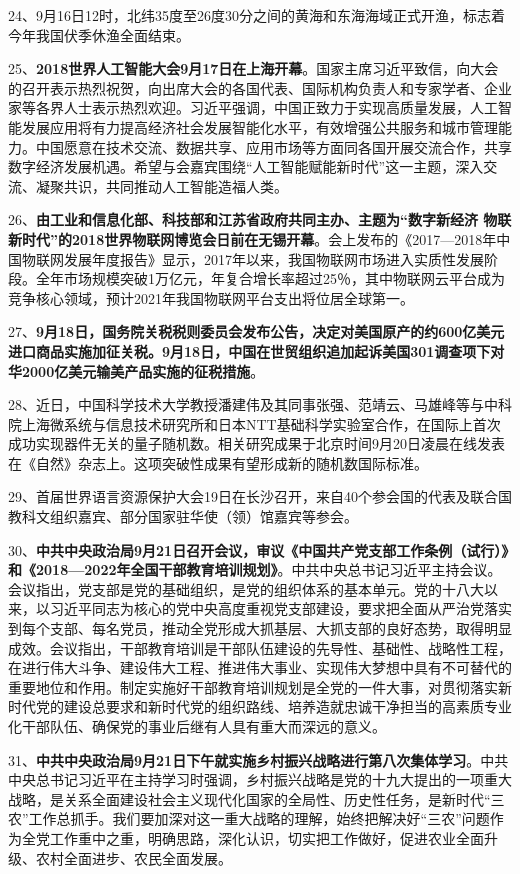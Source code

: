 24、9月16日12时，北纬35度至26度30分之间的黄海和东海海域正式开渔，标志着今年我国伏季休渔全面结束。

25、{\textbf{2018世界人工智能大会9月17日在上海开幕}}。国家主席习近平致信，向大会的召开表示热烈祝贺，向出席大会的各国代表、国际机构负责人和专家学者、企业家等各界人士表示热烈欢迎。习近平强调，中国正致力于实现高质量发展，人工智能发展应用将有力提高经济社会发展智能化水平，有效增强公共服务和城市管理能力。中国愿意在技术交流、数据共享、应用市场等方面同各国开展交流合作，共享数字经济发展机遇。希望与会嘉宾围绕``人工智能赋能新时代''这一主题，深入交流、凝聚共识，共同推动人工智能造福人类。

26、{\textbf{由工业和信息化部、科技部和江苏省政府共同主办、主题为``数字新经济
物联新时代''的2018世界物联网博览会日前在无锡开幕}}。会上发布的《2017---2018年中国物联网发展年度报告》显示，2017年以来，我国物联网市场进入实质性发展阶段。全年市场规模突破1万亿元，年复合增长率超过25％，其中物联网云平台成为竞争核心领域，预计2021年我国物联网平台支出将位居全球第一。

27、{\textbf{9月18日，国务院关税税则委员会发布公告，决定对美国原产的约600亿美元进口商品实施加征关税。9月18日，中国在世贸组织追加起诉美国301调查项下对华2000亿美元输美产品实施的征税措施}}。

28、近日，中国科学技术大学教授潘建伟及其同事张强、范靖云、马雄峰等与中科院上海微系统与信息技术研究所和日本NTT基础科学实验室合作，在国际上首次成功实现器件无关的量子随机数。相关研究成果于北京时间9月20日凌晨在线发表在《自然》杂志上。这项突破性成果有望形成新的随机数国际标准。

29、首届世界语言资源保护大会19日在长沙召开，来自40个参会国的代表及联合国教科文组织嘉宾、部分国家驻华使（领）馆嘉宾等参会。

30、{\textbf{中共中央政治局9月21日召开会议，审议《中国共产党支部工作条例（试行）》和《2018---2022年全国干部教育培训规划》}}。中共中央总书记习近平主持会议。会议指出，党支部是党的基础组织，是党的组织体系的基本单元。党的十八大以来，以习近平同志为核心的党中央高度重视党支部建设，要求把全面从严治党落实到每个支部、每名党员，推动全党形成大抓基层、大抓支部的良好态势，取得明显成效。会议指出，干部教育培训是干部队伍建设的先导性、基础性、战略性工程，在进行伟大斗争、建设伟大工程、推进伟大事业、实现伟大梦想中具有不可替代的重要地位和作用。制定实施好干部教育培训规划是全党的一件大事，对贯彻落实新时代党的建设总要求和新时代党的组织路线、培养造就忠诚干净担当的高素质专业化干部队伍、确保党的事业后继有人具有重大而深远的意义。

31、{\textbf{中共中央政治局9月21日下午就实施乡村振兴战略进行第八次集体学习}}。中共中央总书记习近平在主持学习时强调，乡村振兴战略是党的十九大提出的一项重大战略，是关系全面建设社会主义现代化国家的全局性、历史性任务，是新时代``三农''工作总抓手。我们要加深对这一重大战略的理解，始终把解决好``三农''问题作为全党工作重中之重，明确思路，深化认识，切实把工作做好，促进农业全面升级、农村全面进步、农民全面发展。

